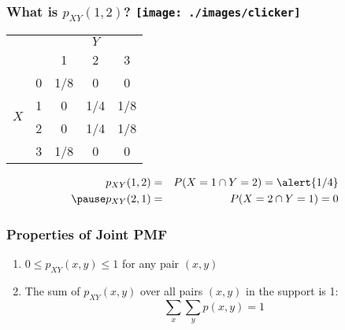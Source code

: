 \begin{frame}
\frametitle{What is $p_{XY}(1,2)$? \hfill \texttt{[image: ./images/clicker]}}

\begin{table}
\begin{tabular}{|cc|ccc|}
\hline
&&\multicolumn{3}{c|}{$Y$}\\
&&1 & 2&3\\
\hline
\multirow{4}{*}{$X$}
&0& \multicolumn{1}{|c}{\alert{1/8}} & \alert{0}& \alert{0}\\
&1& \multicolumn{1}{|c}{\alert{0}} & \alert{1/4}&\alert{1/8}\\
&2& \multicolumn{1}{|c}{\alert{0}} & \alert{1/4}&\alert{1/8}\\
&3& \multicolumn{1}{|c}{\alert{1/8}} & \alert{0}&\alert{0}\\
\hline
\end{tabular}
\end{table}

\pause

\begin{eqnarray*}
p_{XY}(1,2) &=& P(X=1 \cap Y =2) = \alert{1/4}\\ \pause
p_{XY}(2,1) &=& P(X=2 \cap Y =1) = 0
\end{eqnarray*}

\pause


\end{frame}


\begin{frame}
\frametitle{Properties of Joint PMF}
	\begin{enumerate}
		\item $0\leq p_{XY}(x,y)\leq 1$ for any pair $(x,y)$
		\item The sum of $p_{XY}(x,y)$ over all pairs $(x,y)$ in the support is 1:
			$$\sum_{x}\sum_{y} p(x,y) = 1$$
	\end{enumerate}
\end{frame}


